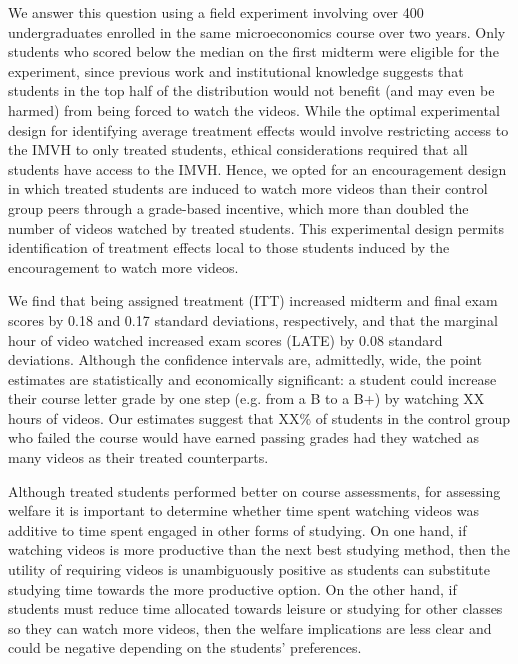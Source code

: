 \documentclass[12pt]{article}
\begin{document}
We answer this question using a field experiment involving over 400 undergraduates enrolled in the same microeconomics course over two years. Only students who scored below the median on the first midterm were eligible for the experiment, since previous work and institutional knowledge suggests that students in the top half of the distribution would not benefit (and may even be harmed) from being forced to watch the videos. While the optimal experimental design for identifying average treatment effects would involve restricting access to the IMVH to only treated students, ethical considerations required that all students have access to the IMVH. Hence, we opted for an encouragement design in which treated students are induced to watch more videos than their control group peers through a grade-based incentive, which more than doubled the number of videos watched by treated students. This experimental design permits identification of treatment effects local to those students induced by the encouragement to watch more videos.

We find that being assigned treatment (ITT) increased midterm and final exam scores by 0.18 and 0.17 standard deviations, respectively, and that the marginal hour of video watched increased exam scores (LATE) by 0.08 standard deviations. Although the confidence intervals are, admittedly, wide, the point estimates are statistically and economically significant: a student could increase their course letter grade by one step (e.g. from a B to a B+) by watching XX hours of videos. Our estimates suggest that XX\% of students in the control group who failed the course would have earned passing grades had they watched as many videos as their treated counterparts.

Although treated students performed better on course assessments, for assessing welfare it is important to determine whether time spent watching videos was additive to time spent engaged in other forms of studying. On one hand, if watching videos is more productive than the next best studying method, then the utility of requiring videos is unambiguously positive as students can substitute studying time towards the more productive option. On the other hand, if students must reduce time allocated towards leisure or studying for other classes so they can watch more videos, then the welfare implications are less clear and could be negative depending on the students' preferences. 
\end{document}
